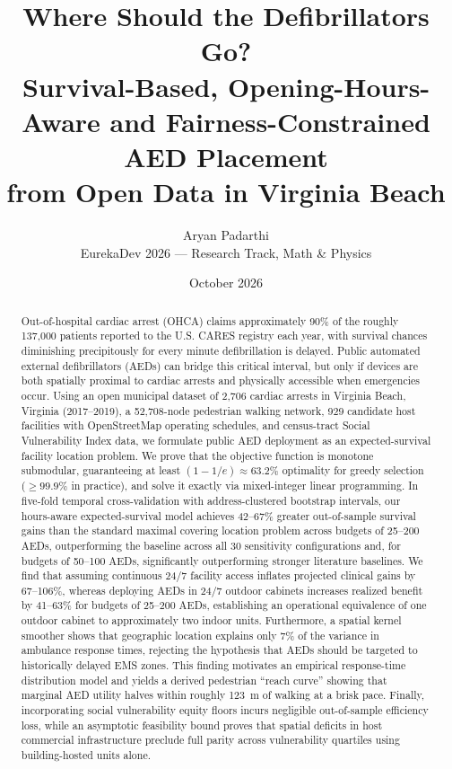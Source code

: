 \documentclass[11pt]{article}
\title{\textbf{Where Should the Defibrillators Go?}\\[0.3em]
\large Survival-Based, Opening-Hours-Aware and Fairness-Constrained AED Placement\\ from Open Data in Virginia Beach}
\author{Aryan Padarthi\\ \small EurekaDev 2026 --- Research Track, Math \& Physics}
\date{October 2026}
\begin{document}
\maketitle

\begin{abstract}
\noindent
Out-of-hospital cardiac arrest (OHCA) claims approximately 90\% of the roughly 137{,}000 patients reported to the U.S. CARES registry each year, with survival chances diminishing precipitously for every minute defibrillation is delayed. Public automated external defibrillators (AEDs) can bridge this critical interval, but only if devices are both spatially proximal to cardiac arrests and physically accessible when emergencies occur. Using an open municipal dataset of 2{,}706 cardiac arrests in Virginia Beach, Virginia (2017--2019), a 52{,}708-node pedestrian walking network, 929 candidate host facilities with OpenStreetMap operating schedules, and census-tract Social Vulnerability Index data, we formulate public AED deployment as an expected-survival facility location problem. We prove that the objective function is monotone submodular, guaranteeing at least $(1-1/e)\approx 63.2\%$ optimality for greedy selection ($\ge 99.9\%$ in practice), and solve it exactly via mixed-integer linear programming. In five-fold temporal cross-validation with address-clustered bootstrap intervals, our hours-aware expected-survival model achieves 42--67\% greater out-of-sample survival gains than the standard maximal covering location problem across budgets of 25--200 AEDs, outperforming the baseline across all 30 sensitivity configurations and, for budgets of 50--100 AEDs, significantly outperforming stronger literature baselines. We find that assuming continuous 24/7 facility access inflates projected clinical gains by 67--106\%, whereas deploying AEDs in 24/7 outdoor cabinets increases realized benefit by 41--63\% for budgets of 25--200 AEDs, establishing an operational equivalence of one outdoor cabinet to approximately two indoor units. Furthermore, a spatial kernel smoother shows that geographic location explains only 7\% of the variance in ambulance response times, rejecting the hypothesis that AEDs should be targeted to historically delayed EMS zones. This finding motivates an empirical response-time distribution model and yields a derived pedestrian ``reach curve'' showing that marginal AED utility halves within roughly 123~m of walking at a brisk pace. Finally, incorporating social vulnerability equity floors incurs negligible out-of-sample efficiency loss, while an asymptotic feasibility bound proves that spatial deficits in host commercial infrastructure preclude full parity across vulnerability quartiles using building-hosted units alone.
\end{abstract}
\end{document}
